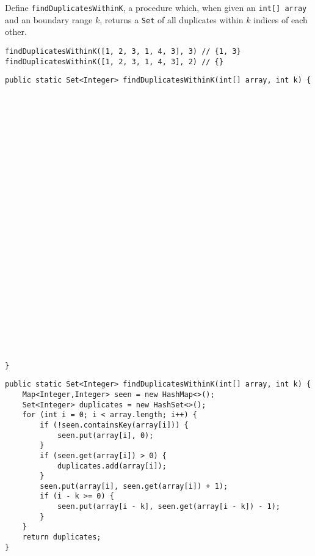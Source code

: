 \question Define \texttt{findDuplicatesWithinK}, a procedure which, when given an \texttt{int[] array} and an boundary range $k$, returns a \texttt{Set} of all  duplicates within $k$ indices of each other.

\begin{lstlisting}
findDuplicatesWithinK([1, 2, 3, 1, 4, 3], 3) // {1, 3}
findDuplicatesWithinK([1, 2, 3, 1, 4, 3], 2) // {}
\end{lstlisting}

\ifprintanswers\else
\begin{lstlisting}
public static Set<Integer> findDuplicatesWithinK(int[] array, int k) {



























}
\end{lstlisting}
\fi

\begin{solution}
\begin{lstlisting}
public static Set<Integer> findDuplicatesWithinK(int[] array, int k) {
    Map<Integer,Integer> seen = new HashMap<>();
    Set<Integer> duplicates = new HashSet<>();
    for (int i = 0; i < array.length; i++) {
        if (!seen.containsKey(array[i])) {
            seen.put(array[i], 0);
        }
        if (seen.get(array[i]) > 0) {
            duplicates.add(array[i]);
        }
        seen.put(array[i], seen.get(array[i]) + 1);
        if (i - k >= 0) {
            seen.put(array[i - k], seen.get(array[i - k]) - 1);
        }
    }
    return duplicates;
}
\end{lstlisting}
\end{solution}
